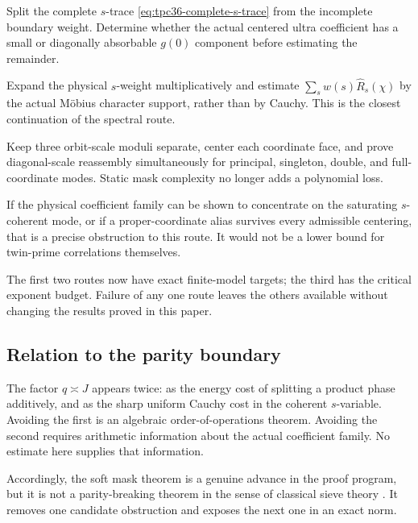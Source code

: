 \begin{description}[style=nextline,leftmargin=2.4em]
 \item[Route A: residue-zero boundary extraction.]
 Split the complete \(s\)-trace
 \eqref{eq:tpc36-complete-s-trace} from the incomplete boundary weight.
 Determine whether the actual centered ultra coefficient has a small or
 diagonally absorbable \(g(0)\) component before estimating the remainder.

 \item[Route B: weighted two-character dispersion.]
 Expand the physical \(s\)-weight multiplicatively and estimate
 \(\sum_sw(s)\widehat R_s(\chi)\) by the actual M\"obius character support,
 rather than by Cauchy.  This is the closest continuation of the spectral
 route.

 \item[Route C: coherent three-modulus CRT.]
 Keep three orbit-scale moduli separate, center each coordinate face, and
 prove diagonal-scale reassembly simultaneously for principal, singleton,
 double, and full-coordinate modes.  Static mask complexity no longer adds
 a polynomial loss.

 \item[Route D: a scoped negative theorem.]
 If the physical coefficient family can be shown to concentrate on the
 saturating \(s\)-coherent mode, or if a proper-coordinate alias survives
 every admissible centering, that is a precise obstruction to this route.
 It would not be a lower bound for twin-prime correlations themselves.
\end{description}

The first two routes now have exact finite-model targets; the third has the
critical exponent budget.  Failure of any one route leaves the others
available without changing the results proved in this paper.

\subsection{Relation to the parity boundary}

The factor \(q\asymp J\) appears twice: as the energy cost of splitting a
product phase additively, and as the sharp uniform Cauchy cost in the
coherent \(s\)-variable.  Avoiding the first is an algebraic
order-of-operations theorem.  Avoiding the second requires arithmetic
information about the actual coefficient family.  No estimate here
supplies that information.

Accordingly, the soft mask theorem is a genuine advance in the proof
program, but it is not a parity-breaking theorem in the sense of classical
sieve theory \citep{HeathBrown1982Parity,IwaniecKowalski2004}.  It removes
one candidate obstruction and exposes the next one in an exact norm.
